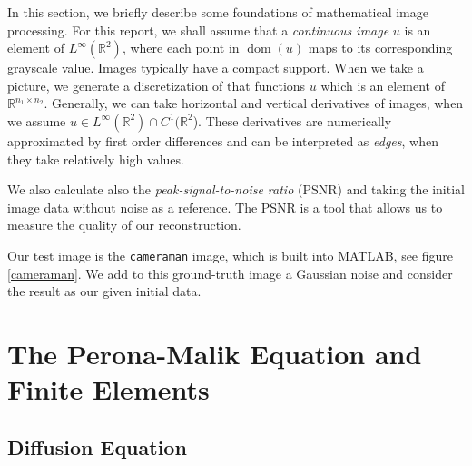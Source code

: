 \documentclass{report}
\DeclareMathOperator{\dom}{dom}
\def\R{\mathbb{R}}
\begin{document}
In this section, we briefly describe some foundations of mathematical image processing. For this report, we shall assume that a \emph{continuous image} $u$ is an element of $L^\infty(\R^2)$, where each point in $\dom(u)$ maps to its corresponding grayscale value. Images typically have a compact support. When we take a picture, we generate a discretization of that functions $u$ which is an element of $\R^{n_1 \times n_2}$. Generally, we can take horizontal and vertical derivatives of images, when we assume $u \in L^\infty(\R^2) \cap C^1(\R^2$). These derivatives are numerically approximated by first order differences and can be interpreted as \emph{edges}, when they take relatively high values.

We also calculate also the \emph{peak-signal-to-noise ratio} (PSNR) and taking the initial image data without noise as a reference. The PSNR is a tool that allows us to measure the quality of our reconstruction.

Our test image is the \texttt{cameraman} image, which is built into MATLAB, see figure \ref{cameraman}. We add to this ground-truth image a Gaussian noise and consider the result as our given initial data.

\section{The Perona-Malik Equation and Finite Elements}

\subsection{Diffusion Equation} \label{sec:diffeqn}
\end{document}

